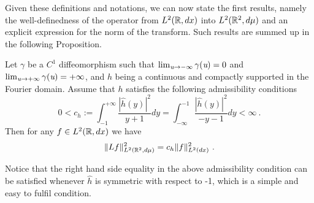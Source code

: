Given these definitions and notations, we can now state the first results, namely the well-definedness of the operator from $L^2(\mathbb{R},dx)$ into $L^2(\mathbb{R}^2,d\mu)$ and an explicit expression for the norm of the transform.
Such results are summed up in the following Proposition.
%
\begin{prop}\label{prop_norm_relation_operator_Q_transform}
Let $\gamma$ be a $C^1$ diffeomorphism such that $\lim_{\textit{u}\to -\infty}\gamma(\textit{u})=0$ and $\lim_{\textit{u}\to +\infty}\gamma(\textit{u})=+\infty$, and $h$ being a continuous and compactly supported in the Fourier domain. 
Assume that $h$ satisfies the following admissibility conditions
\begin{equation}
    0<c_h := \int_{-1}^{+\infty}\frac{|\hat{h}(y)|^2}{y+1}dy = \int_{-\infty}^{-1}\frac{|\hat{h}(y)|^2}{-y-1}dy<\infty\ .
    \label{CQT.admissibility}
\end{equation}
Then for any $f\in L^2(\mathbb{R},dx)$ we have
\begin{equation}
    \|Lf\|^2_{L^2(\mathbb{R}^2,d\mu)} = c_h \|f\|_{L^2(dx)}^2\ .
\end{equation}
\end{prop}
Notice that the right hand side equality in the above admissibility condition can be satisfied whenever $\hat h$ is symmetric with respect to -1, which is a simple and easy to fulfil condition.
